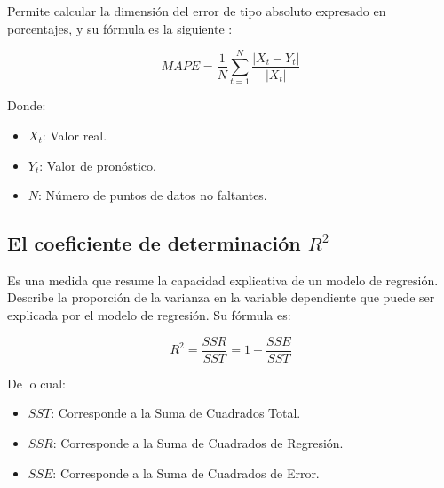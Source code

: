 Permite calcular la dimensión del error de tipo absoluto expresado en porcentajes, y su fórmula es la siguiente \cite{chang2023comparacion}:

\[
MAPE = \frac{1}{N} \sum_{t=1}^{N} \frac{|X_t - Y_t|}{|X_t|}
\]

Donde:

\begin{itemize}
  \item $X_t$: Valor real.
  \item $Y_t$: Valor de pronóstico.
  \item $N$: Número de puntos de datos no faltantes.
\end{itemize}


\subsection{El coeficiente de determinación \( R^2 \)} 

Es una medida que resume la capacidad explicativa de un modelo de regresión. Describe la proporción de la varianza en la variable dependiente que puede ser explicada por el modelo de regresión\cite{chang2023comparacion}. Su fórmula es:

\[
R^2 = \frac{SSR}{SST} = 1 - \frac{SSE}{SST}
\]

De lo cual: 
\begin{itemize}
  \item \(SST\): Corresponde a la Suma de Cuadrados Total.
  \item \(SSR\): Corresponde a la Suma de Cuadrados de Regresión.
  \item \(SSE\): Corresponde a la Suma de Cuadrados de Error.
\end{itemize}





